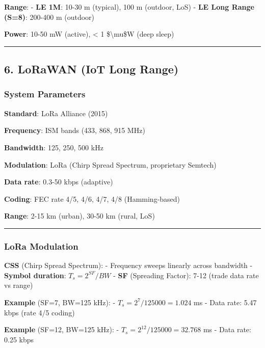 \textbf{Range}: - \textbf{LE 1M}: 10-30 m (typical), 100 m (outdoor,
LoS) - \textbf{LE Long Range (S=8)}: 200-400 m (outdoor)

\textbf{Power}: 10-50 mW (active), \textless{} 1 \$\textbackslash mu\$W
(deep sleep)

\begin{center}\rule{0.5\linewidth}{0.5pt}\end{center}

\subsection{6. LoRaWAN (IoT Long Range)}\label{lorawan-iot-long-range}

\subsubsection{System Parameters}\label{system-parameters-5}

\textbf{Standard}: LoRa Alliance (2015)

\textbf{Frequency}: ISM bands (433, 868, 915 MHz)

\textbf{Bandwidth}: 125, 250, 500 kHz

\textbf{Modulation}: LoRa (Chirp Spread Spectrum, proprietary Semtech)

\textbf{Data rate}: 0.3-50 kbps (adaptive)

\textbf{Coding}: FEC rate 4/5, 4/6, 4/7, 4/8 (Hamming-based)

\textbf{Range}: 2-15 km (urban), 30-50 km (rural, LoS)

\begin{center}\rule{0.5\linewidth}{0.5pt}\end{center}

\subsubsection{LoRa Modulation}\label{lora-modulation}

\textbf{CSS} (Chirp Spread Spectrum): - Frequency sweeps linearly across
bandwidth - \textbf{Symbol duration}: \(T_s = 2^{SF} / BW\) -
\textbf{SF} (Spreading Factor): 7-12 (trade data rate vs range)

\textbf{Example} (SF=7, BW=125 kHz): - \(T_s = 2^7 / 125000 = 1.024\) ms
- Data rate: 5.47 kbps (rate 4/5 coding)

\textbf{Example} (SF=12, BW=125 kHz): -
\(T_s = 2^{12} / 125000 = 32.768\) ms - Data rate: 0.25 kbps

